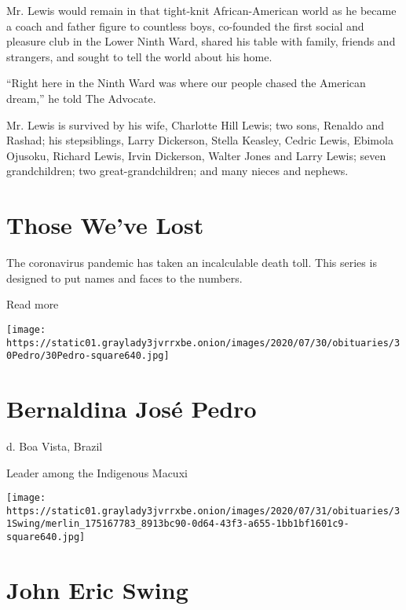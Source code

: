 Mr. Lewis would remain in that tight-knit African-American world as he
became a coach and father figure to countless boys, co-founded the first
social and pleasure club in the Lower Ninth Ward, shared his table with
family, friends and strangers, and sought to tell the world about his
home.

``Right here in the Ninth Ward was where our people chased the American
dream,'' he told The Advocate.

Mr. Lewis is survived by his wife, Charlotte Hill Lewis; two sons,
Renaldo and Rashad; his stepsiblings, Larry Dickerson, Stella Keasley,
Cedric Lewis, Ebimola Ojusoku, Richard Lewis, Irvin Dickerson, Walter
Jones and Larry Lewis; seven grandchildren; two great-grandchildren; and
many nieces and nephews.

\href{https://www.nytimes3xbfgragh.onion/interactive/2020/obituaries/people-died-coronavirus-obituaries.html?action=click\&pgtype=Article\&state=default\&region=BELOW_MAIN_CONTENT\&context=covid_obits_promo}{}

\hypertarget{those-weve-lost}{%
\section{Those We've Lost}\label{those-weve-lost}}

The coronavirus pandemic has taken an incalculable death toll. This
series is designed to put names and faces to the numbers.

Read more

\texttt{[image: https://static01.graylady3jvrrxbe.onion/images/2020/07/30/obituaries/30Pedro/30Pedro-square640.jpg]}

\hypertarget{bernaldina-josuxe9-pedro}{%
\section{Bernaldina José Pedro}\label{bernaldina-josuxe9-pedro}}

d. Boa Vista, Brazil

Leader among the Indigenous Macuxi

\texttt{[image: https://static01.graylady3jvrrxbe.onion/images/2020/07/31/obituaries/31Swing/merlin\_175167783\_8913bc90-0d64-43f3-a655-1bb1bf1601c9-square640.jpg]}

\hypertarget{john-eric-swing}{%
\section{John Eric Swing}\label{john-eric-swing}}

